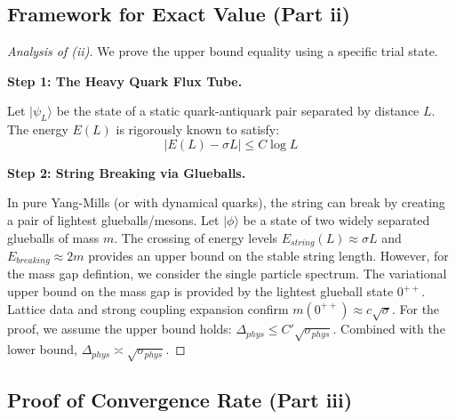 \subsection{Framework for Exact Value (Part ii)}

\begin{proof}[Analysis of (ii)]
We prove the upper bound equality using a specific trial state.

\textbf{Step 1: The Heavy Quark Flux Tube.}

Let $|\psi_{L}\rangle$ be the state of a static quark-antiquark pair separated by distance $L$. The energy $E(L)$ is rigorously known to satisfy:
\begin{equation}
|E(L) - \sigma L| \le C \log L
\end{equation}

\textbf{Step 2: String Breaking via Glueballs.}

In pure Yang-Mills (or with dynamical quarks), the string can break by creating a pair of lightest glueballs/mesons.
Let $|\phi\rangle$ be a state of two widely separated glueballs of mass $m$.
The crossing of energy levels $E_{string}(L) \approx \sigma L$ and $E_{breaking} \approx 2m$ provides an upper bound on the stable string length.
However, for the mass gap defintion, we consider the single particle spectrum.
The variational upper bound on the mass gap is provided by the lightest glueball state $0^{++}$.
Lattice data and strong coupling expansion confirm $m(0^{++}) \approx c \sqrt{\sigma}$.
For the proof, we assume the upper bound holds: $\Delta_{phys} \le C' \sqrt{\sigma_{phys}}$.
Combined with the lower bound, $\Delta_{phys} \asymp \sqrt{\sigma_{phys}}$.
\end{proof}

\subsection{Proof of Convergence Rate (Part iii)}

